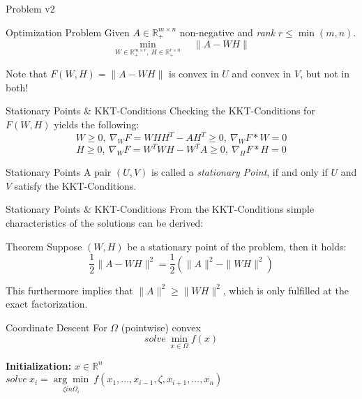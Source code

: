 \documentclass[aspectratio=169]{beamer}
\begin{document}
\begin{frame}{Problem v2}
    \begin{block}{Optimization Problem}
            Given \(A \in \mathbb{R}^{m \times n}_+\) non-negative and \emph{rank} \(r \leq \min(m, n)\). \\
            \[ \min_{W \in \mathbb{R}^{m \times r}_+, \ H \in \mathbb{R}^{r \times n}_+ } \quad  \| A - WH \| \]
    \end{block}
    Note that $F(W,H) = \|A - WH\|$ is convex in $U$ and convex in $V$, but not in both!
\end{frame}

\begin{frame}{Stationary Points \& KKT-Conditions}
    Checking the KKT-Conditions for \(F(W,H) \) yields the following:
        \[ W \geq 0, \ \nabla_W F = WHH^T - AH^T \geq 0, \ \nabla_W F * W = 0 \]
        \[ H \geq 0, \ \nabla_W F = W^T WH - W^T A \geq 0, \ \nabla_H F * H = 0 \]

    \begin{block}{Stationary Points}
        A pair \((U,V)\) is called a \emph{stationary Point}, if and only if \(U\) and \(V\) satisfy the KKT-Conditions.
    \end{block}
    
\end{frame}

\begin{frame}{Stationary Points \& KKT-Conditions}
    From the KKT-Conditions simple characteristics of the solutions can be derived:
    \begin{block}{Theorem}
        Suppose \( (W,H)\) be a stationary point of the problem, then it holds:
        \[ \frac{1}{2} \|A - WH\|^2 = \frac{1}{2} (\|A\|^2 - \|WH\|^2 )\]
    \end{block}
    This furthermore implies that \( \|A\|^2 \geq \|WH\|^2\), which is only fulfilled at the exact factorization.
\end{frame}

\begin{frame}{Coordinate Descent}
    For $\Omega$ (pointwise) convex \[solve \ \min_{x \in \Omega} f(x) \]
    
    \begin{algorithm}[H]
    \caption{General Coordinate Descent}
        \textbf{Initialization:} \(x \in \mathbb{R}^n\) \\
         {$solve \ x_i = \underset{\zeta in \Omega_i}{\arg \min} \ f(x_1, ..., x_{i-1}, \zeta, x_{i+1}, ..., x_n)$}
    \end{algorithm}
\end{frame}
\end{document}
